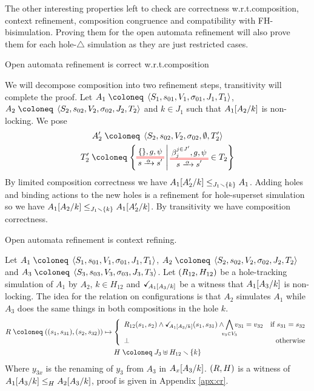 \documentclass{article}
\begin{document}
The other interesting properties left to check are correctness w.r.t.\@ composition, context refinement, composition congruence and compatibility with FH-bisimulation.
Proving them for the open automata refinement will also prove them for each hole-\(\triangle\) simulation as they are just restricted cases.
\begin{thm} Open automata refinement is correct w.r.t.\@ composition \end{thm}
We will decompose composition into two refinement steps, transitivity will complete the proof.
Let \(A_1 \defobject \OAg[1]\), \(A_2 \defobject \OAg[2]\) and \(k \in J_1\) such that \(A_1\subst{A_2}{k}\) is non-locking.
We pose
\begin{gather*}
	A'_2 \defobject \OA{S_2}{s_{02}}{V_2}{\sigma_{02}}{\emptyset}{T'_2} \\
	T'_2 \defobject \mset{\OT{s}{s'}{\alpha}{\mbrc{}}{g}{\psi}}{\OTg \in T_2}
\end{gather*}
By limited composition correctness we have \(\wrel{A_1\subst{A'_2}{k}}{A_1}{J_1 \setminus \mbrc{k}}\).
Adding holes and binding actions to the new holes is a refinement for hole-superset simulation so we have \(\wrel{A_1\subst{A_2}{k}}{A_1\subst{A'_2}{k}}{J_1 \setminus \mbrc{k}}\).
By transitivity we have composition correctness.
\begin{thm} Open automata refinement is context refining. \end{thm}
Let \(A_1 \defobject \OAg[1]\), \(A_2 \defobject \OAg[2]\) and \(A_3 \defobject \OAg[3]\).
Let \(\mpar{R_{12}, H_{12}}\) be a hole-tracking simulation of \(A_1\) by \(A_2\), \(k \in H_{12}\) and \(\reach{A_1\subst{A_3}{k}}\) be a witness that \(A_1\subst{A_3}{k}\) is non-locking.
The idea for the relation on configurations is that \(A_2\) simulates \(A_1\) while \(A_3\) does the same things in both compositions in the hole \(k\).
\begin{gather*}
	R \defobject \mpar{\mpar{s_1, s_{31}}, \mpar{s_2, s_{32}}} \mapsto \choice{R_{12}\mpar{s_1, s_2} \wedge \reach{A_1\subst{A_3}{k}}\mpar{s_1, s_{31}} \wedge \bigwedge_\subbox{v_3 \in V_3} v_{31} = v_{32} & \text{if } s_{31} = s_{32} \\ \bot & \text{otherwise}} \\
	H \defobject J_3 \uplus H_{12} \setminus \mbrc{k}
\end{gather*}
Where \(y_{3x}\) is the renaming of \(y_3\) from \(A_3\) in \(A_x\subst{A_3}{k}\).
\(\mpar{R, H}\) is a witness of \(\wrel{A_1\subst{A_3}{k}}{A_2\subst{A_3}{k}}{H}\), proof is given in Appendix \ref{apx:cr}.
\end{document}

